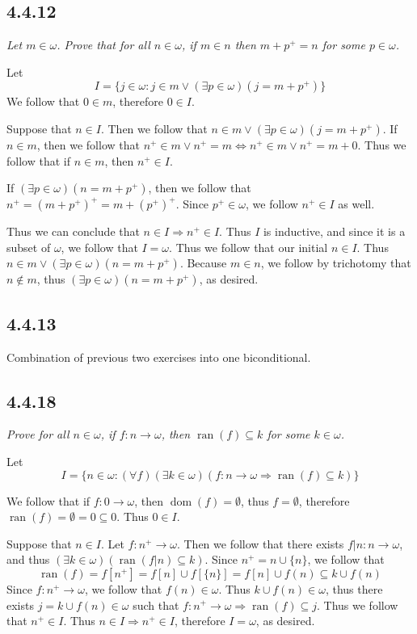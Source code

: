 \documentclass[11pt,oneside,titlepage]{book}
\DeclareMathOperator \lra {\Leftrightarrow}
\DeclareMathOperator \ra {\Rightarrow}
\DeclareMathOperator \dom {dom}
\DeclareMathOperator \ran {ran}
\begin{document}
\subsection*{4.4.12}

\textit{Let $m \in \omega$. Prove that for all $n \in \omega$, if $m \in n$ then
  $m + p^+ = n$ for some $p \in \omega$.}

Let
$$I = \{j \in \omega: j \in m \lor (\exists p \in \omega)(j = m + p^+) \}$$
We follow that $0 \in m$, therefore $0 \in I$.

Suppose that $n \in I$. Then we follow that $n \in m \lor (\exists p \in \omega) (j = m + p^+)$.
If $n \in m$, then we follow that $n^+ \in m \lor n^+ = m \lra
n^+ \in m \lor n^+ = m + 0 $. Thus we follow that if $n \in m$, then $n^+ \in I$.

If $(\exists p \in \omega)(n = m + p^+)$, then we follow that $n^+ = (m + p^+)^+ = m + (p^+)^+$.
Since $p^+ \in \omega$, we follow $n^+ \in I$ as well.

Thus we can conclude that $n \in I \ra n^+ \in I$. Thus $I$ is inductive, and since it is
a subset of $\omega$, we follow that $I = \omega$. Thus we follow that our initial $n \in I$.
Thus $n \in m \lor (\exists p \in \omega)(n = m + p^+)$. Because $m \in n$, we follow
by trichotomy that $n \notin m$, thus $ (\exists p \in \omega)(n = m + p^+)$, as desired.

\subsection*{4.4.13}

Combination of previous two exercises into one biconditional.

\subsection*{4.4.18}

\textit{Prove for all $n \in \omega$, if $f: n \to \omega$, then $\ran(f) \subseteq k$ for
  some $k \in \omega$.}


Let
$$I = \{n \in \omega: (\forall f)
(\exists k \in \omega)(f: n \to \omega \ra \ran(f) \subseteq k)\}$$

We follow that if $f: 0 \to \omega$, then $\dom(f) = \emptyset$, thus $f = \emptyset$, therefore
$\ran(f) = \emptyset = 0 \subseteq 0$. Thus $0 \in I$.

Suppose that $n \in I$. Let $f: n^+ \to \omega$. Then we follow that
there exists $f|n: n \to \omega$, and thus $(\exists k \in \omega)(\ran(f|n) \subseteq k)$.
Since $n^+ = n \cup \{n\}$, we follow that
$$\ran(f) = f[n^+] = f[n] \cup f[\{n\}] = f[n] \cup f(n) \subseteq k \cup f(n)$$
Since $f: n^+ \to \omega$, we follow that $f(n) \in \omega$. Thus $k \cup f(n) \in \omega$,
thus there exists $j = k \cup f(n) \in \omega$ such that
$f: n^+ \to \omega \ra \ran(f) \subseteq j$. Thus we follow that $n^+ \in I$.
Thus $n \in I \ra n^+ \in I$, therefore $I = \omega$, as desired.
\end{document}
